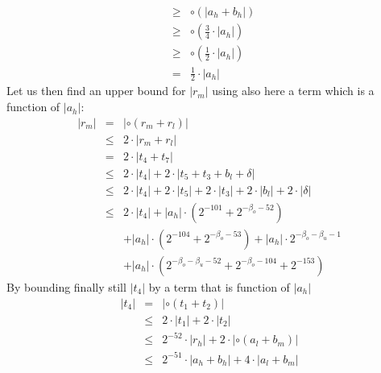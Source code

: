 \documentclass[a4paper,10pt,twoside]{article}
\newenvironment{proof}[1][Proof]{\begin{trivlist}
\item[\hskip \labelsep {\bfseries #1}]}{\end{trivlist}}
\newcommand{\hi}{\ensuremath{\mathit{h}}}
\newcommand{\mi}{\ensuremath{\mathit{m}}}
\newcommand{\lo}{\ensuremath{\mathit{l}}}
\begin{document}
\begin{proof}
\begin{eqnarray*}
& \geq & \circ \left( \left \vert a_\hi + b_\hi \right \vert \right) \\
& \geq & \circ \left( \frac{3}{4} \cdot \left \vert a_\hi \right \vert \right) \\
& \geq & \circ \left( \frac{1}{2} \cdot \left \vert a_\hi \right \vert \right) \\
& = & \frac{1}{2} \cdot \left \vert a_\hi \right \vert
\end{eqnarray*}
Let us then find an upper bound for $\left \vert r_\mi \right \vert$
using also here a term which is a function of $\left \vert a_\hi \right \vert$:
\begin{eqnarray*}
\left \vert r_\mi \right \vert & = & \left \vert \circ \left( r_\mi + r_\lo \right) \right \vert \\
& \leq & 2 \cdot \left \vert r_\mi + r_\lo \right \vert \\
& = & 2 \cdot \left \vert t_4 + t_7 \right \vert \\
& \leq & 2 \cdot \left \vert t_4 \right \vert + 2 \cdot \left \vert t_5 + t_3 + b_\lo + \delta \right \vert \\
& \leq & 2 \cdot \left \vert t_4 \right \vert + 2 \cdot \left \vert t_5 \right \vert +
2 \cdot  \left \vert t_3 \right \vert + 2 \cdot \left \vert b_\lo \right \vert + 2 \cdot \left \vert \delta \right \vert \\
& \leq & 2 \cdot \left \vert t_4 \right \vert + \left \vert a_\hi \right \vert \cdot \left( 2^{-101} + 2^{-\beta_o-52} \right) \\
& & + \left \vert a_\hi \right \vert \cdot \left( 2^{-104} + 2^{-\beta_o-53} \right) +
\left \vert a_\hi \right \vert \cdot 2^{-\beta_o-\beta_u-1} \\
& & +
\left \vert a_\hi \right \vert \cdot \left( 2^{-\beta_o-\beta_u-52} + 2^{-\beta_o-104} + 2^{-153}\right)
\end{eqnarray*}
By bounding finally still $\left \vert t_4 \right \vert$ by a term that is function of $\left \vert a_\hi \right \vert$
\begin{eqnarray*}
\left \vert t_4 \right \vert & = & \left \vert \circ \left( t_1 + t_2 \right) \right \vert \\
& \leq & 2 \cdot \left \vert t_1 \right \vert + 2 \cdot \left \vert t_2 \right \vert \\
& \leq & 2^{-52} \cdot \left \vert r_\hi \right \vert + 2 \cdot \left \vert \circ \left( a_\lo + b_\mi \right) \right \vert \\
& \leq & 2^{-51} \cdot \left \vert a_\hi + b_\hi \right \vert + 4 \cdot \left \vert a_\lo + b_\mi \right \vert \\

\end{eqnarray*}
\end{proof}
\end{document}
